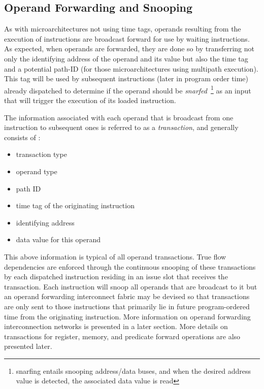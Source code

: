 \documentclass[10pt,dvips]{article}
\begin{document}
\subsection{Operand Forwarding and Snooping}
%
As with microarchitectures not using time tags,
operands resulting from the execution of instructions
are broadcast forward for use by waiting instructions.
As expected, when operands are forwarded, they are done so
by transferring not only the identifying address of the operand
and its value but also the time tag and a potential path-ID (for
those microarchitectures using multipath execution).
This tag will be used by subsequent 
instructions 
(later in program order time)
already dispatched
to determine if
the operand should be {\em snarfed}~\footnote{snarfing entails snooping
address/data buses, and when the desired address value is detected, 
the associated data value is read} 
as an input that will trigger
the execution of its loaded instruction.

The information associated with each operand that is
broadcast from one instruction to subsequent ones
is referred
to as a {\em transaction}, and generally consists of :
%
\vspace{-0.05in}
\begin{itemize}
\vspace{-0.1in}
\item{transaction type}
\vspace{-0.1in}
\item{operand type}
\vspace{-0.1in}
\item{path ID}
\vspace{-0.1in}
\item{time tag of the originating instruction}
\vspace{-0.1in}
\item{identifying address}
\vspace{-0.1in}
\item{data value for this operand}
\vspace{-0.1in}
\end{itemize}   
%
This above information is typical of all operand transactions.
True flow dependencies are enforced through the continuous snooping of
these transactions by each dispatched instruction residing in an issue
slot that receives the transaction.
Each instruction
will snoop all operands that are broadcast to it but
an operand forwarding interconnect fabric may be devised so that
transactions are only sent to those instructions that primarily
lie in future program-ordered time from the originating instruction.  
More information on operand forwarding interconnection networks
is presented in a later section.
More details on transactions for register, memory, and
predicate forward operations are also presented later.
\end{document}
